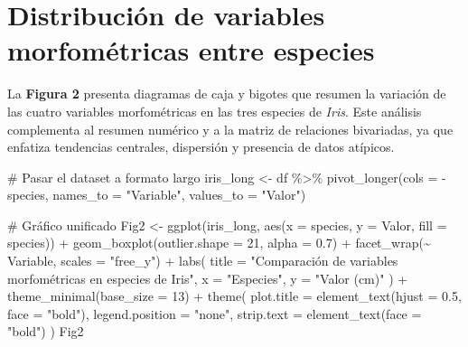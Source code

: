 \documentclass[
  spanish,
  11pt,
  a4paper,
  DIV=11,
  numbers=noendperiod]{scrartcl}
\newenvironment{Shaded}{\begin{snugshade}}{\end{snugshade}}
\newcommand{\AttributeTok}[1]{\textcolor[rgb]{0.40,0.45,0.13}{#1}}
\newcommand{\CommentTok}[1]{\textcolor[rgb]{0.37,0.37,0.37}{#1}}
\newcommand{\DecValTok}[1]{\textcolor[rgb]{0.68,0.00,0.00}{#1}}
\newcommand{\FloatTok}[1]{\textcolor[rgb]{0.68,0.00,0.00}{#1}}
\newcommand{\FunctionTok}[1]{\textcolor[rgb]{0.28,0.35,0.67}{#1}}
\newcommand{\NormalTok}[1]{\textcolor[rgb]{0.00,0.23,0.31}{#1}}
\newcommand{\OtherTok}[1]{\textcolor[rgb]{0.00,0.23,0.31}{#1}}
\newcommand{\SpecialCharTok}[1]{\textcolor[rgb]{0.37,0.37,0.37}{#1}}
\newcommand{\StringTok}[1]{\textcolor[rgb]{0.13,0.47,0.30}{#1}}
\begin{document}
\section{Distribución de variables morfométricas entre
especies}\label{distribuciuxf3n-de-variables-morfomuxe9tricas-entre-especies}

La \textbf{Figura 2} presenta diagramas de caja y bigotes que resumen la
variación de las cuatro variables morfométricas en las tres especies de
\emph{Iris}. Este análisis complementa al resumen numérico y a la matriz
de relaciones bivariadas, ya que enfatiza tendencias centrales,
dispersión y presencia de datos atípicos.

\begin{Shaded}
\begin{Highlighting}[numbers=left,,]
\CommentTok{\# Pasar el dataset a formato largo}
\NormalTok{iris\_long }\OtherTok{\textless{}{-}}\NormalTok{ df }\SpecialCharTok{\%\textgreater{}\%}
  \FunctionTok{pivot\_longer}\NormalTok{(}\AttributeTok{cols =} \SpecialCharTok{{-}}\NormalTok{species,}
               \AttributeTok{names\_to =} \StringTok{"Variable"}\NormalTok{,}
               \AttributeTok{values\_to =} \StringTok{"Valor"}\NormalTok{)}

\CommentTok{\# Gráfico unificado}
\NormalTok{Fig2 }\OtherTok{\textless{}{-}} \FunctionTok{ggplot}\NormalTok{(iris\_long, }\FunctionTok{aes}\NormalTok{(}\AttributeTok{x =}\NormalTok{ species, }\AttributeTok{y =}\NormalTok{ Valor, }\AttributeTok{fill =}\NormalTok{ species)) }\SpecialCharTok{+}
  \FunctionTok{geom\_boxplot}\NormalTok{(}\AttributeTok{outlier.shape =} \DecValTok{21}\NormalTok{, }\AttributeTok{alpha =} \FloatTok{0.7}\NormalTok{) }\SpecialCharTok{+}
  \FunctionTok{facet\_wrap}\NormalTok{(}\SpecialCharTok{\textasciitilde{}}\NormalTok{ Variable, }\AttributeTok{scales =} \StringTok{"free\_y"}\NormalTok{) }\SpecialCharTok{+}
  \FunctionTok{labs}\NormalTok{(}
    \AttributeTok{title =} \StringTok{"Comparación de variables morfométricas en especies de Iris"}\NormalTok{,}
    \AttributeTok{x =} \StringTok{"Especies"}\NormalTok{,}
    \AttributeTok{y =} \StringTok{"Valor (cm)"}
\NormalTok{  ) }\SpecialCharTok{+}
  \FunctionTok{theme\_minimal}\NormalTok{(}\AttributeTok{base\_size =} \DecValTok{13}\NormalTok{) }\SpecialCharTok{+}
  \FunctionTok{theme}\NormalTok{(}
    \AttributeTok{plot.title =} \FunctionTok{element\_text}\NormalTok{(}\AttributeTok{hjust =} \FloatTok{0.5}\NormalTok{, }\AttributeTok{face =} \StringTok{"bold"}\NormalTok{),}
    \AttributeTok{legend.position =} \StringTok{"none"}\NormalTok{,}
    \AttributeTok{strip.text =} \FunctionTok{element\_text}\NormalTok{(}\AttributeTok{face =} \StringTok{"bold"}\NormalTok{)}
\NormalTok{  )}
\NormalTok{Fig2}
\end{Highlighting}
\end{Shaded}
\end{document}
